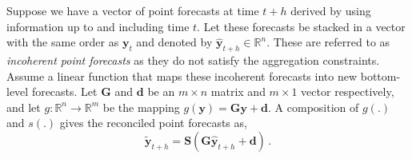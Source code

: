 \documentclass[12pt]{article}
\theoremstyle{definition}
\newtheorem{definition}{Definition}[section]
\begin{document}





Suppose we have a vector of point forecasts at time $t+h$ derived by using information up to and including time $t$. Let these forecasts be stacked in a vector with the same order as $\bm{y}_t$ and denoted by $\hat{\bm{y}}_{t+h} \in \mathbb{R}^n$. These are referred to as \emph{incoherent point forecasts} as they do not satisfy the aggregation constraints. Assume a linear function that maps these incoherent forecasts into new bottom-level forecasts.
Let $\bm{G}$ and $\bm{d}$ be an $m\times n$ matrix and $m\times 1$ vector respectively, and let $g:\mathbb{R}^n \rightarrow \mathbb{R}^m$ be the mapping $g(\bm{y})=\bm{G}\bm{y}+\bm{d}$. A composition of $g(.)$ and $s(.)$ gives the reconciled point forecasts as,
\begin{equation} \label{eq:ReconPoint}
\tilde{\bm{y}}_{t+h}=\bm{S}(\bm{G}\hat{\bm{y}}_{t+h}+\bm{d})\,.
\end{equation}
\end{document}

